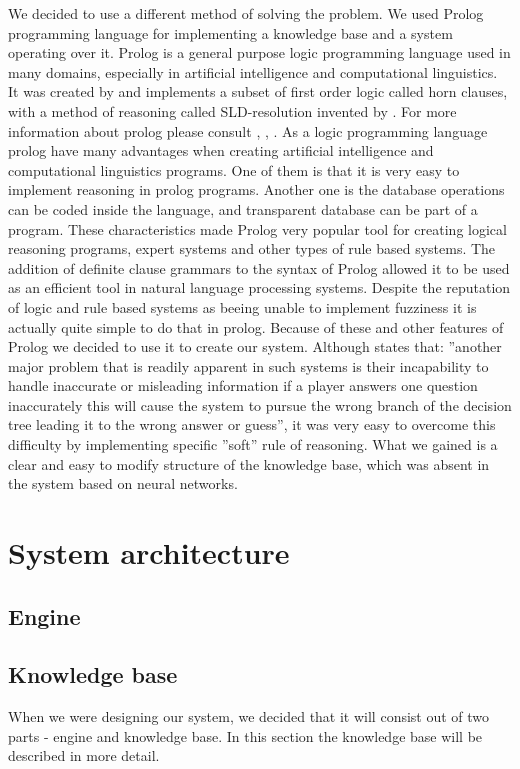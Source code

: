 \documentclass[a4paper]{article}
\begin{document}
We decided to use a different method of solving the problem. We used Prolog programming language for implementing a knowledge base and a system operating over it. Prolog is a general purpose logic programming language used in many domains, especially in artificial intelligence and computational linguistics. It was created by \citet{Prolog} and implements a subset of first order logic called horn clauses, with a method of reasoning called SLD-resolution invented by \citet{SLD}. For more information about prolog please consult \citet{Prolog1}, \citet{Prolog2}, \citet{Prolog2}. As a logic programming language prolog have many advantages when creating artificial intelligence and computational linguistics programs. One of them is that it is very easy to implement reasoning in prolog programs. Another one is the database operations can be coded inside the language, and transparent database can be part of a program. These characteristics made Prolog very popular tool for creating logical reasoning programs, expert systems and other types of rule based systems. The addition of definite clause grammars to the syntax of Prolog allowed it to be used as an efficient tool in natural language processing systems. Despite the reputation of logic and rule based systems as beeing unable to implement fuzziness it is actually quite simple to do that in prolog. Because of these and other features of Prolog we decided to use it to create our system. Although \citet{20Q} states that: ''another major problem that is readily apparent in such systems is their incapability to handle inaccurate or misleading information if a player answers one question inaccurately this will cause the system to pursue the wrong branch of the decision tree leading it to the wrong answer or guess'', it was very easy to overcome this difficulty by implementing specific ''soft'' rule of reasoning. What we gained is a clear and easy to modify structure of the knowledge base, which was absent in the system based on neural networks.
\section{System architecture}
\subsection{Engine}

\subsection{Knowledge base}
When we were designing our system, we decided that it will consist out of two parts - engine and knowledge base. In this section the knowledge base will be described in more detail.
\end{document}
